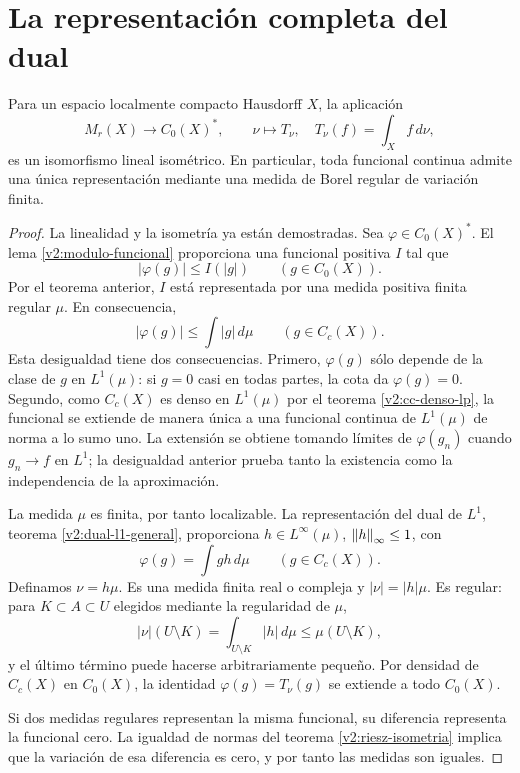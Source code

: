 \section{La representación completa del dual}
\begin{teorema}\label{v2:riesz-c0}
Para un espacio localmente compacto Hausdorff $X$, la aplicación
\[
 M_r(X)\longrightarrow C_0(X)^*,\qquad
 \nu\longmapsto T_\nu,\quad T_\nu(f)=\int_X f\,d\nu,
\]
es un isomorfismo lineal isométrico. En particular, toda funcional continua admite una única representación mediante una medida de Borel regular de variación finita.
\end{teorema}
\begin{proof}
La linealidad y la isometría ya están demostradas. Sea $\varphi\in C_0(X)^*$. El lema \ref{v2:modulo-funcional} proporciona una funcional positiva $I$ tal que
\[
 |\varphi(g)|\le I(|g|)\qquad(g\in C_0(X)).
\]
Por el teorema anterior, $I$ está representada por una medida positiva finita regular $\mu$. En consecuencia,
\[
 |\varphi(g)|\le\int|g|\,d\mu\qquad(g\in C_c(X)).
\]
Esta desigualdad tiene dos consecuencias. Primero, $\varphi(g)$ sólo depende de la clase de $g$ en $L^1(\mu)$: si $g=0$ casi en todas partes, la cota da $\varphi(g)=0$. Segundo, como $C_c(X)$ es denso en $L^1(\mu)$ por el teorema \ref{v2:cc-denso-lp}, la funcional se extiende de manera única a una funcional continua de $L^1(\mu)$ de norma a lo sumo uno. La extensión se obtiene tomando límites de $\varphi(g_n)$ cuando $g_n\to f$ en $L^1$; la desigualdad anterior prueba tanto la existencia como la independencia de la aproximación.

La medida $\mu$ es finita, por tanto localizable. La representación del dual de $L^1$, teorema \ref{v2:dual-l1-general}, proporciona $h\in L^\infty(\mu)$, $\left\lVert h\right\rVert_\infty\le1$, con
\[
 \varphi(g)=\int gh\,d\mu\qquad(g\in C_c(X)).
\]
Definamos $\nu=h\mu$. Es una medida finita real o compleja y $|\nu|=|h|\mu$. Es regular: para $K\subset A\subset U$ elegidos mediante la regularidad de $\mu$,
\[
 |\nu|(U\setminus K)=\int_{U\setminus K}|h|\,d\mu
 \le\mu(U\setminus K),
\]
y el último término puede hacerse arbitrariamente pequeño. Por densidad de $C_c(X)$ en $C_0(X)$, la identidad $\varphi(g)=T_\nu(g)$ se extiende a todo $C_0(X)$.

Si dos medidas regulares representan la misma funcional, su diferencia representa la funcional cero. La igualdad de normas del teorema \ref{v2:riesz-isometria} implica que la variación de esa diferencia es cero, y por tanto las medidas son iguales.
\end{proof}
